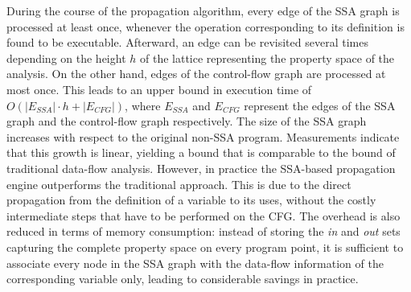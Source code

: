 {
\def\ESSA{E_{\textit{SSA}}}
\def\ECFG{E_{\textit{CFG}}}
During the course of the propagation algorithm, every edge of the SSA graph is processed at least once, whenever the operation corresponding to its definition is found to be executable. 
Afterward, an edge can be revisited several times depending on the height $h$ of the lattice representing the property space of the analysis. 
On the other hand, edges of the control-flow graph are processed at most once. 
This leads to an upper bound in execution time of $O(|\ESSA| \cdot h + |\ECFG|)$, where $\ESSA$ and $\ECFG$ represent the edges of the SSA graph and the control-flow graph respectively. 
The size of the SSA graph increases with respect to the original non-SSA program. 
Measurements indicate that this growth is linear, yielding a bound that is comparable to the bound of traditional data-flow analysis. 
However, in practice the SSA-based propagation engine outperforms the traditional approach. 
This is due to the direct propagation from the definition of a variable to its uses, without the costly intermediate steps that have to be performed on the CFG. 
The overhead is also reduced in terms of memory consumption: 
instead of storing the \emph{in} and \emph{out} sets capturing the complete property space on every program point, it is sufficient to associate every node in the SSA graph with the data-flow information of the corresponding variable only, leading to considerable savings in practice.  }




